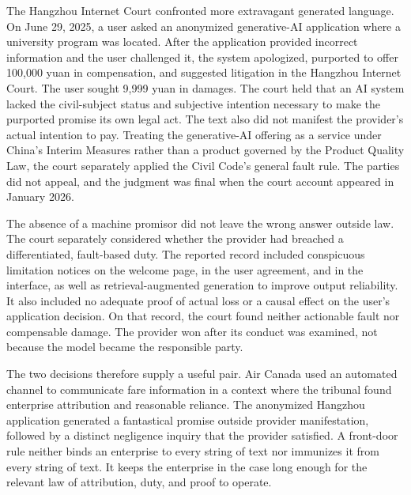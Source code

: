 The Hangzhou Internet Court confronted more extravagant generated language. On June 29, 2025, a user asked an anonymized generative-AI application where a university program was located. After the application provided incorrect information and the user challenged it, the system apologized, purported to offer 100,000 yuan in compensation, and suggested litigation in the Hangzhou Internet Court. The user sought 9,999 yuan in damages. The court held that an AI system lacked the civil-subject status and subjective intention necessary to make the purported promise its own legal act. The text also did not manifest the provider's actual intention to pay. Treating the generative-AI offering as a service under China's Interim Measures rather than a product governed by the Product Quality Law, the court separately applied the Civil Code's general fault rule. The parties did not appeal, and the judgment was final when the court account appeared in January 2026.

The absence of a machine promisor did not leave the wrong answer outside law. The court separately considered whether the provider had breached a differentiated, fault-based duty. The reported record included conspicuous limitation notices on the welcome page, in the user agreement, and in the interface, as well as retrieval-augmented generation to improve output reliability. It also included no adequate proof of actual loss or a causal effect on the user's application decision. On that record, the court found neither actionable fault nor compensable damage. The provider won after its conduct was examined, not because the model became the responsible party.

The two decisions therefore supply a useful pair. Air Canada used an automated channel to communicate fare information in a context where the tribunal found enterprise attribution and reasonable reliance. The anonymized Hangzhou application generated a fantastical promise outside provider manifestation, followed by a distinct negligence inquiry that the provider satisfied. A front-door rule neither binds an enterprise to every string of text nor immunizes it from every string of text. It keeps the enterprise in the case long enough for the relevant law of attribution, duty, and proof to operate.

